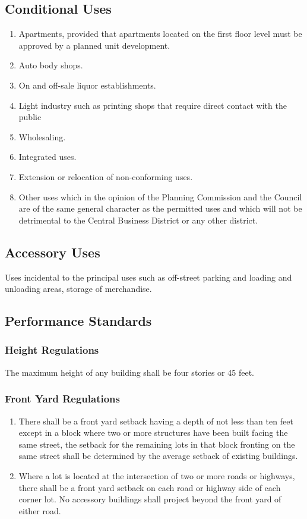 \subsection{Conditional Uses}
\begin{enumerate}[{\indent}1)]
    \item Apartments, provided that apartments located on the first floor level must be approved by a planned unit development.
    \item Auto body shops.
    \item On and off-sale liquor establishments.
    \item Light industry such as printing shops that require direct contact with the public
    \item Wholesaling.
    \item Integrated uses.
    \item Extension or relocation of non-conforming uses.
    \item Other uses which in the opinion of the Planning Commission and the Council are of the same general character as the permitted uses and which will not be detrimental to the Central Business District or any other district.
\end{enumerate}
\subsection{Accessory Uses}
Uses incidental to the principal uses such as off-street parking and loading and unloading areas, storage of merchandise.
\subsection{Performance Standards}
\subsubsection{Height Regulations}
The maximum height of any building shall be four stories or 45 feet.
\subsubsection{Front Yard Regulations}
\begin{enumerate}[{\indent}a)]
    \item There shall be a front yard setback having a depth of not less than ten feet except in a block where two or more structures have been built facing the same street, the setback for the remaining lots in that block fronting on the same street shall be determined by the average setback of existing buildings.
    \item Where a lot is located at the intersection of two or more roads or highways, there shall be a front yard setback on each road or highway side of each corner lot.  No accessory buildings shall project beyond the front yard of either road.
\end{enumerate}
